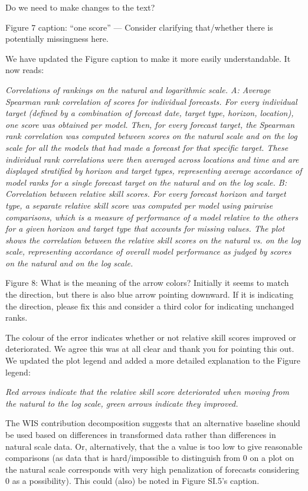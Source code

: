 \documentclass{article}
\newcommand{\red}{\color{red}}
\newcommand{\black}{\color{black}}
\newcommand{\blue}{\color{blue}}
\begin{document}
Do we need to make changes to the text? 

\blue
Figure 7 caption: “one score” — Consider clarifying that/whether there is potentially missingness here.

\black
We have updated the Figure caption to make it more easily understandable. It now reads: 

\textit{Correlations of rankings on the natural and logarithmic scale. A: Average Spearman rank correlation of scores for individual forecasts. For every individual target (defined by a combination of forecast date, target type, horizon, location), one score was obtained per model. Then, for every forecast target, the Spearman rank correlation was computed between scores on the natural scale and on the log scale for all the models that had made a forecast for that specific target. These individual rank correlations were then averaged across locations and time and are displayed stratified by horizon and target types, representing average accordance of model ranks for a single forecast target on the natural and on the log scale. B: Correlation between relative skill scores. For every forecast horizon and target type, a separate relative skill score was computed per model using pairwise comparisons, which is a measure of performance of a model relative to the others for a given horizon and target type that accounts for missing values. The plot shows the correlation between the relative skill scores on the natural vs. on the log scale, representing accordance of overall model performance as judged by scores on the natural and on the log scale.}


\blue
Figure 8: What is the meaning of the arrow colors? Initially it seems to match the direction, but there is also blue arrow pointing downward. If it is indicating the direction, please fix this and consider a third color for indicating unchanged ranks.

\black
The colour of the error indicates whether or not relative skill scores improved or deteriorated. We agree this was at all clear and thank you for pointing this out. We updated the plot legend and added a more detailed explanation to the Figure legend: 

\textit{Red arrows indicate that the relative skill score deteriorated when moving from the natural to the log scale, green arrows indicate they improved.}

\red
The WIS contribution decomposition suggests that an alternative baseline should be used based on differences in transformed data rather than differences in natural scale data. Or, alternatively, that the a value is too low to give reasonable comparisons (as data that is hard/impossible to distinguish from 0 on a plot on the natural scale corresponds with very high penalization of forecasts considering 0 as a possibility). This could (also) be noted in Figure SI.5’s caption.
\end{document}
